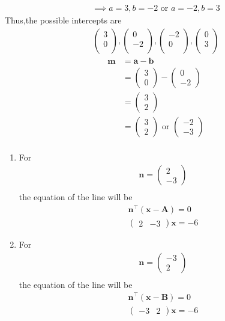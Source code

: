 \documentclass[10pt]{article}
\providecommand{\brak}[1]{\ensuremath{\left(#1\right)}}
\newcommand{\myvec}[1]{\ensuremath{\begin{pmatrix}#1\end{pmatrix}}}
\let\vec\mathbf
\begin{document}
\begin{align}
\implies a=3,b=-2 \text{ or }   a=-2,b=3
\end{align}
Thus,the possible intercepts are\\
\begin{align}
\myvec{3\\ 0 \\} ,\myvec{0\\ -2 \\} ,\myvec{-2\\ 0 \\}, \myvec{0\\ 3 \\}
\end{align}
\begin{align}
\vec{m}&=\vec{a}-\vec{b}\\
&=\myvec{3\\0}-\myvec{0\\-2}\\
&=\myvec{3\\2}\\
&=\myvec{3\\2} \text{ or } \myvec{-2\\-3}\\
\end{align}
\begin{enumerate}
\item For
\begin{align}
\vec{n} = \myvec{ 2\\-3}\\
\end{align}
the equation of the line will be\\
\begin{align}
\vec{n}^{\top}\brak{\vec{x}-\vec{A}}=0\\
\myvec{2&-3}\vec{x}=-6
\end{align}
\item For
\begin{align}
\vec{n}=\myvec{-3\\2}\\
\end{align}
the equation of the line will be\\
\begin{align}
\vec{n}^{\top}\brak{\vec{x}-\vec{B}}=0\\
\myvec{-3&2}\vec{x}=-6
\end{align}
\end{enumerate}
\end{document}
